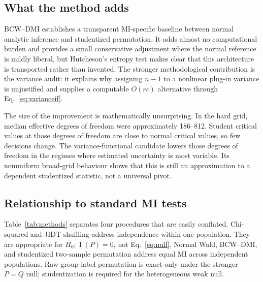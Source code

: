 \documentclass[10pt,twocolumn]{article}
\newcommand{\MI}{\operatorname{I}}
\newcommand{\method}{BCW--DMI}
\begin{document}
\subsection{What the method adds}

\method{} establishes a transparent MI-specific baseline between normal
analytic inference and studentized permutation. It adds almost no
computational burden and provides a small conservative adjustment where the
normal reference is mildly liberal, but Hutcheson's entropy test makes clear
that this architecture is transported rather than invented. The stronger
methodological contribution is the variance audit: it explains why assigning
\(n-1\) to a nonlinear plug-in variance is unjustified and supplies a
computable \(O(rc)\) alternative through Eq.~\eqref{eq:varianceif}.

The size of the improvement is mathematically unsurprising. In the hard grid,
median effective degrees of freedom were approximately 186--812. Student
critical values at those degrees of freedom are close to normal critical
values, so few decisions change. The variance-functional candidate lowers
those degrees of freedom in the regimes where estimated uncertainty is most
variable. Its nonuniform broad-grid behaviour shows that this is still an
approximation to a dependent studentized statistic, not a universal pivot.

\subsection{Relationship to standard MI tests}

Table~\ref{tab:methods} separates four procedures that are easily conflated.
Chi-squared and JIDT shuffling address independence within one population.
They are appropriate for \(H_0:\MI(P)=0\), not Eq.~\eqref{eq:null}. Normal
Wald, \method, and studentized two-sample permutation address equal MI across
independent populations. Raw group-label permutation is exact only under the
stronger \(P=Q\) null; studentization is required for the heterogeneous weak
null.
\end{document}

